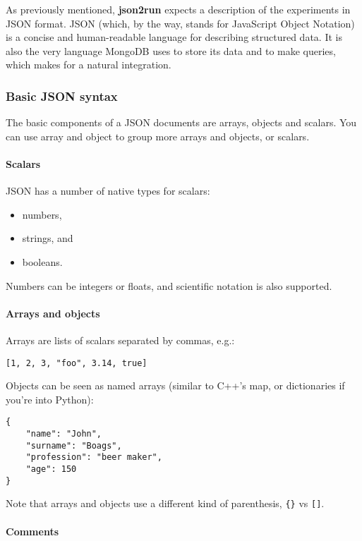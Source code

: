 \documentclass[11pt,notitlepage,twoside,a4paper]{article}
\begin{document}
As previously mentioned, \textbf{json2run} expects a description of the
experiments in JSON format. JSON (which, by the way, stands for
JavaScript Object Notation) is a concise and human-readable language for
describing structured data. It is also the very language MongoDB uses to
store its data and to make queries, which makes for a natural
integration.

\subsubsection{Basic JSON syntax}

The basic components of a JSON documents are arrays, objects and
scalars. You can use array and object to group more arrays and objects,
or scalars.

\paragraph{Scalars}
\noindent
JSON has a number of native types for scalars:

\begin{itemize}
\item
  numbers,
\item
  strings, and
\item
  booleans.
\end{itemize}
Numbers can be integers or floats, and scientific notation is also
supported.

\paragraph{Arrays and objects}
Arrays are lists of scalars separated by commas, e.g.:

\begin{lstlisting} 
[1, 2, 3, "foo", 3.14, true]
\end{lstlisting}

\noindent
Objects can be seen as named arrays (similar to C++'s map, or
dictionaries if you're into Python):

\begin{lstlisting} 
{  
    "name": "John",
    "surname": "Boags",
    "profession": "beer maker",
    "age": 150
}
\end{lstlisting}

\noindent
Note that arrays and objects use a different kind of parenthesis,
\texttt{\{\}} vs \texttt{{[}{]}}.

\paragraph{Comments}
\end{document}
